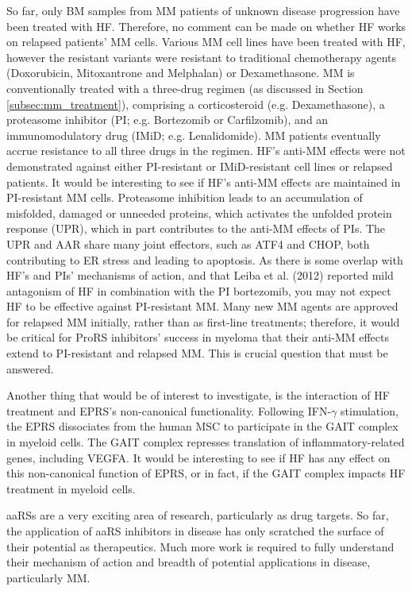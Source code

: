 So far, only BM samples from MM patients of unknown disease progression have been treated with HF\@.
Therefore, no comment can be made on whether HF works on relapsed patients' MM cells.
Various MM cell lines have been treated with HF, however the resistant variants were resistant to traditional chemotherapy agents (Doxorubicin, Mitoxantrone and Melphalan) or Dexamethasone.
MM is conventionally treated with a three-drug regimen (as discussed in Section \ref{subsec:mm_treatment}), comprising a corticosteroid (e.g. Dexamethasone), a proteasome inhibitor (PI; e.g. Bortezomib or Carfilzomib), and an immunomodulatory drug (IMiD; e.g. Lenalidomide).
MM patients eventually accrue resistance to all three drugs in the regimen.
HF's anti-MM effects were not demonstrated against either PI-resistant or IMiD-resistant cell lines or relapsed patients.
It would be interesting to see if HF's anti-MM effects are maintained in PI-resistant MM cells.
Proteasome inhibition leads to an accumulation of misfolded, damaged or unneeded proteins, which activates the unfolded protein response (UPR), which in part contributes to the anti-MM effects of PIs.
The UPR and AAR share many joint effectors, such as ATF4 and CHOP, both contributing to ER stress and leading to apoptosis.
As there is some overlap with HF's and PIs' mechanisms of action, and that Leiba et al. (2012) reported mild antagonism of HF in combination with the PI bortezomib\cite{leiba2012halofuginone}, you may not expect HF to be effective against PI-resistant MM.
Many new MM agents are approved for relapsed MM initially, rather than as first-line treatments;
therefore, it would be critical for ProRS inhibitors' success in myeloma that their anti-MM effects extend to PI-resistant and relapsed MM.
This is crucial question that must be answered.

Another thing that would be of interest to investigate, is the interaction of HF treatment and EPRS's non-canonical functionality.
Following IFN-$\gamma$ stimulation, the EPRS dissociates from the human MSC to participate in the GAIT complex in myeloid cells.
The GAIT complex represses translation of inflammatory-related genes, including VEGFA.
It would be interesting to see if HF has any effect on this non-canonical function of EPRS, or in fact, if the GAIT complex impacts HF treatment in myeloid cells.

aaRSs are a very exciting area of research, particularly as drug targets.
So far, the application of aaRS inhibitors in disease has only scratched the surface of their potential as therapeutics.
Much more work is required to fully understand their mechanism of action and breadth of potential applications in disease, particularly MM\@.
